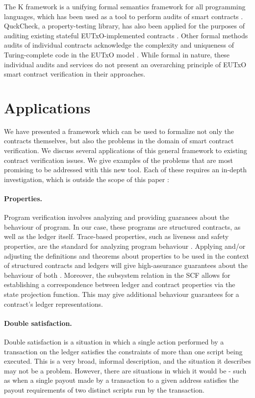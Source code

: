 The K framework \cite{kframework} is a unifying formal semantics framework for
all programming languages, which has been used as a tool to perform
audits of smart contracts \cite{runtimev}. QuckCheck, a property-testing
library, has also been applied for the purposes of auditing
existing stateful EUTxO-implemented contracts \cite{quviq}. Other formal
methods audits of individual contracts acknowledge the complexity and uniqueness
of Turing-complete code in the EUTxO model \cite{tweag}. While formal in nature,
these individual audits and services do not present an overarching principle of
EUTxO smart contract verification in their approaches.

\section{Applications}
\label{sec:applications}

We have presented a framework which can be used to formalize not only the contracts
themselves, but also the
problems in the domain of smart contract verification.
We discuss several applications of this general framework
to existing contract verification issues.
We give examples of the problems that are most promising to be addressed
with this new tool. Each of these requires an in-depth investigation, which is
outside the scope of this paper :

\paragraph{Properties. } Program verification involves analyzing and providing guaranees
about the behaviour of program. In our case, these programs are structured
contracts, as well as the ledger itself. Trace-based properties, such as liveness
and safety properties,
are the standard for analyzing program behaviour \cite{liveness}.
Applying and/or
adjusting the definitions and theorems about properties to be used in the context of
structured contracts and ledgers will give high-assurance guarantees about
the behaviour of both \cite{properties}. Moreover, the subsystem relation in the SCF allows
for establishing a correspondence between ledger and contract properties via the
state projection function. This may give additional behaviour guarantees for
a contract's ledger representations.

\paragraph{Double satisfaction. } Double satisfaction is a situation in which
a single action performed by a transaction on the ledger satisfies the constraints
of more than one script being executed. This is a very broad, informal description,
and the situation it describes may not be a problem.
However, there are situations in which it would be - such as when a single payout
made by a transaction to a given address satisfies the payout requirements of
two distinct scripts run by the transaction.

